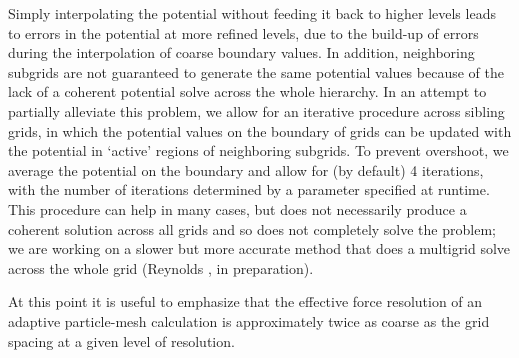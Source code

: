 Simply interpolating the potential without feeding it back to higher levels leads to errors in the potential at more refined levels, due to the build-up of errors during the interpolation of coarse boundary values.  In addition, neighboring subgrids are not guaranteed to generate the same potential values because of the lack of a coherent potential solve across the whole hierarchy.  In an attempt to partially alleviate this problem, we allow for an iterative procedure across sibling grids, in which the potential values on the boundary of grids can be updated with the potential in `active' regions of neighboring subgrids.  To prevent overshoot, we average the potential on the boundary and allow for (by default) 4 iterations, with the number of iterations determined by a parameter specified at runtime.  This procedure can help in many cases, but does not necessarily produce a coherent solution across all grids and so does not completely solve the problem; we are working on a slower but more accurate method that does a multigrid solve across the whole grid (Reynolds \etal, in preparation).

At this point it is useful to emphasize that the effective force resolution of an adaptive particle-mesh calculation is approximately twice as coarse as the grid spacing at a given level of resolution.

